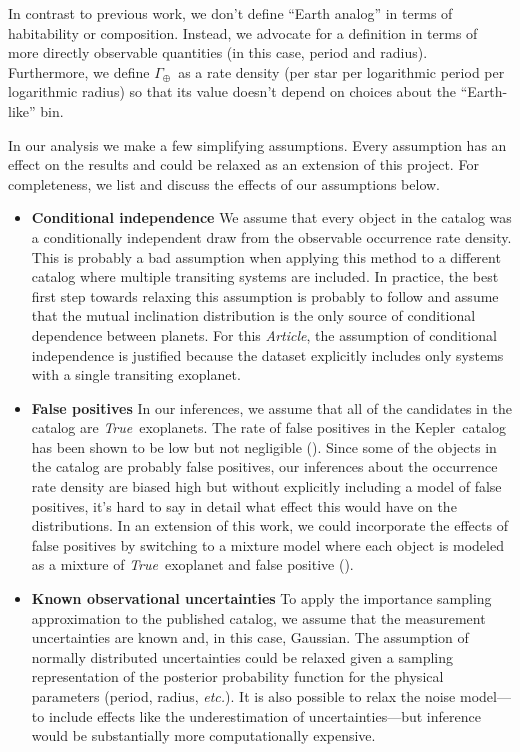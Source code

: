 \documentclass[12pt,preprint]{aastex}
\newcommand{\project}[1]{{\sffamily #1}}
\newcommand{\kepler}{\project{Kepler}}
\newcommand{\paper}{\textsl{Article}}
\newcommand{\foreign}[1]{\emph{#1}}
\newcommand{\etc}{\foreign{etc.}}
\newcommand{\True}{\foreign{True}}
\newcommand{\rate}{\ensuremath{\Gamma}}
\newcommand{\gammaearth}{{\ensuremath{\rate_\oplus}}}
\begin{document}
In contrast to previous work, we don't define ``Earth analog'' in terms of
habitability or composition.
Instead, we advocate for a definition in terms of more directly observable
quantities (in this case, period and radius).
Furthermore, we define \gammaearth\ as a rate density (per star per
logarithmic period per logarithmic radius) so that its value doesn't depend on
choices about the ``Earth-like'' bin.

In our analysis we make a few simplifying assumptions.
Every assumption has an effect on the results and could be relaxed as an
extension of this project.
For completeness, we list and discuss the effects of our assumptions below.
\begin{itemize}

\item {\bf Conditional independence}\quad
We assume that every object in the catalog was a conditionally independent
draw from the observable occurrence rate density.
This is probably a bad assumption when applying this method to a different
catalog where multiple transiting systems are included.
In practice, the best first step towards relaxing this assumption is probably
to follow \citet{tremaine} and assume that the mutual inclination distribution
is the only source of conditional dependence between planets.
For this \paper, the assumption of conditional independence is justified
because the dataset explicitly includes only systems with a single transiting
exoplanet.

\item {\bf False positives}\quad
In our inferences, we assume that all of the candidates in the catalog are
\True\ exoplanets.
The rate of false positives in the \kepler\ catalog has been shown to be low
but not negligible (\citealt{morton, fressin-fp}).
Since some of the objects in the catalog are probably false positives, our
inferences about the occurrence rate density are biased high but without
explicitly including a model of false positives, it's hard to say in detail
what effect this would have on the distributions.
In an extension of this work, we could incorporate the effects of false
positives by switching to a mixture model where each object is modeled as a
mixture of \True\ exoplanet and false positive (\citealt{hogg-line}).

\item {\bf Known observational uncertainties}\quad
To apply the importance sampling approximation to the published catalog, we
assume that the measurement uncertainties are known and, in this case,
Gaussian.
The assumption of normally distributed uncertainties could be relaxed given
a sampling representation of the posterior probability function for the
physical parameters (period, radius, \etc).
It is also possible to relax the noise model---to include effects like the
underestimation of uncertainties---but inference would be substantially more
computationally expensive.


\end{itemize}
\end{document}
